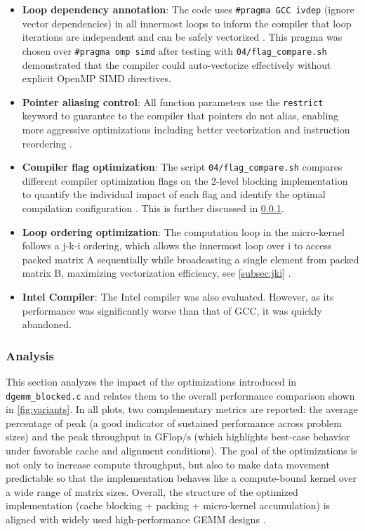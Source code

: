 \documentclass[unicode,10pt,a4paper,oneside,numbers=endperiod,openany]{scrartcl}
\begin{document}
\begin{itemize}
    \item \textbf{Loop dependency annotation}: The code uses \verb|#pragma GCC ivdep| (ignore vector dependencies) in all innermost loops to inform the compiler that loop iterations are independent and can be safely vectorized \cite{gcc_manual}. This pragma was chosen over \verb|#pragma omp simd| after testing with \verb|04/flag_compare.sh| demonstrated that the compiler could auto-vectorize effectively without explicit OpenMP SIMD directives.

    \item \textbf{Pointer aliasing control}: All function parameters use the \verb|restrict| keyword to guarantee to the compiler that pointers do not alias, enabling more aggressive optimizations including better vectorization and instruction reordering \cite{gcc_manual}.

    \item \textbf{Compiler flag optimization}: The script \verb|04/flag_compare.sh| compares different compiler optimization flags on the 2-level blocking implementation to quantify the individual impact of each flag and identify the optimal compilation configuration \cite{gcc_manual,atlas}. This is further discussed in \ref{subsec:analysis}.

    \item \textbf{Loop ordering optimization}: The computation loop in the micro-kernel follows a j-k-i ordering, which allows the innermost loop over i to access packed matrix A sequentially while broadcasting a single element from packed matrix B, maximizing vectorization efficiency, see \ref{subsec:jki} \cite{goto_gemm,blis_toms}.

    \item \textbf{Intel Compiler}: The Intel compiler was also evaluated. However, as its performance was significantly worse than that of GCC, it was quickly abandoned.
\end{itemize}

\subsubsection{Analysis}
\label{subsec:analysis}
This section analyzes the impact of the optimizations introduced in \verb|dgemm_blocked.c| and relates them to the overall performance comparison shown in \autoref{fig:variants}. In all plots, two complementary metrics are reported: the average percentage of peak (a good indicator of sustained performance across problem sizes) and the peak throughput in $\mathrm{GFlop/s}$ (which highlights best-case behavior under favorable cache and alignment conditions). The goal of the optimizations is not only to increase compute throughput, but also to make data movement predictable so that the implementation behaves like a compute-bound kernel over a wide range of matrix sizes. Overall, the structure of the optimized implementation (cache blocking + packing + micro-kernel accumulation) is aligned with widely used high-performance GEMM designs \cite{goto_gemm,blis_toms}.
\end{document}
